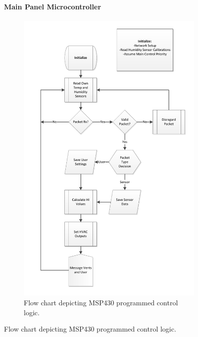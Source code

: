 \begin{figure}
\paragraph{Main Panel Microcontroller}
\begin{figure}
\centering
\includegraphics[height=.9\textheight]{maincntl_flow.pdf}
\caption{Flow chart depicting MSP430 programmed control logic.}
\label{fig:maincntl_flow}
\end{figure}


\end{figure}
